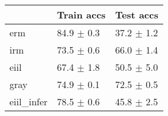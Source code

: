 \begin{tabular}{lll}
\toprule
{} &      Train accs &       Test accs \\
\midrule
erm        &  84.9 $\pm$ 0.3 &  37.2 $\pm$ 1.2 \\
irm        &  73.5 $\pm$ 0.6 &  66.0 $\pm$ 1.4 \\
eiil       &  67.4 $\pm$ 1.8 &  50.5 $\pm$ 5.0 \\
gray       &  74.9 $\pm$ 0.1 &  72.5 $\pm$ 0.5 \\
eiil_infer &  78.5 $\pm$ 0.6 &  45.8 $\pm$ 2.5 \\
\bottomrule
\end{tabular}

